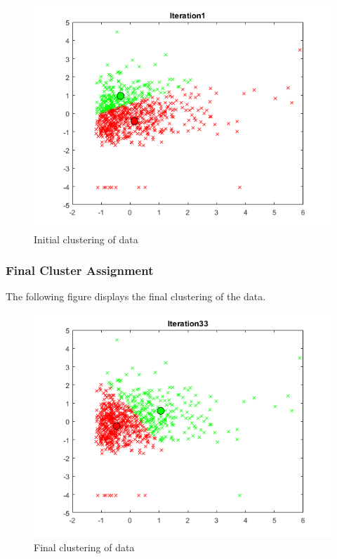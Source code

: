 \documentclass[12pt]{article}
\begin{document}
\begin{figure}[h!]
    \begin{center}
        \includegraphics[scale=1.2]{TQ2_b.png}
        \caption{Initial clustering of data}
    \end{center}    
\end{figure}

\newpage

\subsubsection{Final Cluster Assignment}
The following figure displays the final clustering of the data.

\begin{figure}[h!]
    \begin{center}
        \includegraphics[scale=1.2]{TQ2_c.png}
        \caption{Final clustering of data}
    \end{center}    
\end{figure}
\end{document}
